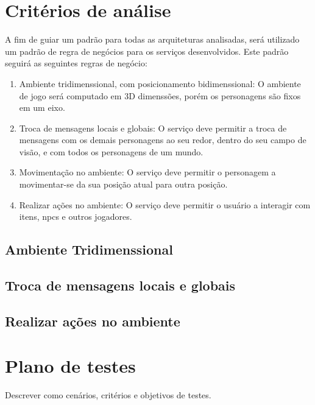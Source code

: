 \section{Critérios de análise}

A fim de guiar um padrão para todas as arquiteturas analisadas, será utilizado um padrão de regra de negócios para os serviços desenvolvidos.
%
Este padrão seguirá as seguintes regras de negócio:

\begin{enumerate}
  \item Ambiente tridimenssional, com posicionamento bidimenssional: O ambiente de jogo será computado em 3D dimenssões, porém os personagens são fixos em um eixo.
  \item Troca de mensagens locais e globais: O serviço deve permitir a troca de mensagens com os demais personagens ao seu redor, dentro do seu campo de visão, e com todos os personagens de um mundo.
  \item Movimentação no ambiente: O serviço deve permitir o personagem a movimentar-se da sua posição atual para outra posição.
  \item Realizar ações no ambiente: O serviço deve permitir o usuário a interagir com itens, \ac{npcs} e outros jogadores.
\end{enumerate}

\subsection{Ambiente Tridimenssional}
\subsection{Troca de mensagens locais e globais}
\subsection{Realizar ações no ambiente}

\section{Plano de testes}

Descrever como cenários, critérios e objetivos de testes.

